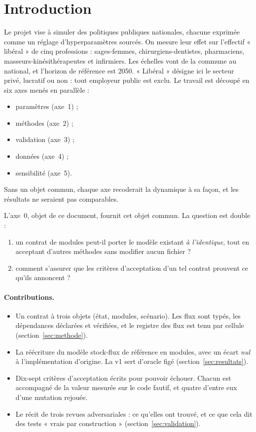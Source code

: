 \documentclass[11pt]{article}
\begin{document}
\section{Introduction}

Le projet vise à simuler des politiques publiques nationales, chacune exprimée comme un réglage
d'hyperparamètres sourcés. On mesure leur effet sur l'effectif « libéral » de cinq professions :
sages-femmes, chirurgiens-dentistes, pharmaciens, masseurs-kinésithérapeutes et infirmiers. Les
échelles vont de la commune au national, et l'horizon de référence est 2050. « Libéral » désigne ici
le secteur privé, lucratif ou non : tout employeur public est exclu. Le travail est découpé en six axes
menés en parallèle :
\begin{itemize}
  \item paramètres (axe~1) ;
  \item méthodes (axe~2) ;
  \item validation (axe~3) ;
  \item données (axe~4) ;
  \item sensibilité (axe~5).
\end{itemize}
Sans un objet commun, chaque axe recoderait la dynamique à sa façon, et les résultats ne seraient
pas comparables.

L'axe~0, objet de ce document, fournit cet objet commun. La question est double :
\begin{enumerate}
  \item un contrat de modules peut-il porter le modèle existant \emph{à l'identique}, tout en
        acceptant d'autres méthodes sans modifier aucun fichier ?
  \item comment s'assurer que les critères d'acceptation d'un tel contrat prouvent ce qu'ils
        annoncent ?
\end{enumerate}

\paragraph{Contributions.}
\begin{itemize}
  \item Un contrat à trois objets (état, modules, scénario). Les flux sont typés, les dépendances
        déclarées et vérifiées, et le registre des flux est tenu par cellule (section~\ref{sec:methode}).
  \item La réécriture du modèle stock-flux de référence en modules, avec un écart \emph{nul} à
        l'implémentation d'origine. La v1 sert d'oracle figé (section~\ref{sec:resultats}).
  \item Dix-sept critères d'acceptation écrits pour pouvoir échouer. Chacun est accompagné de la valeur
        mesurée sur le code fautif, et quatre d'entre eux d'une mutation rejouée.
  \item Le récit de trois revues adversariales : ce qu'elles ont trouvé, et ce que cela dit des tests
        « vrais par construction » (section~\ref{sec:validation}).
\end{itemize}
\end{document}
